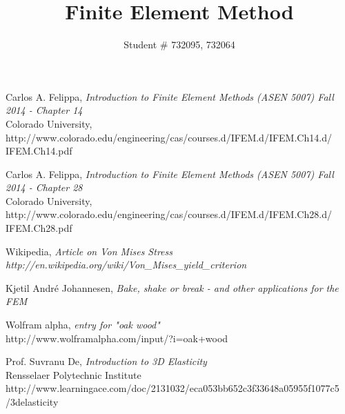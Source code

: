 \documentclass[9pt]{extarticle}
\title{Finite Element Method}
\author{Student \# 732095, 732064 }
\begin{document}
\maketitle































\newpage
\begin{thebibliography}{3}

	Carlos A. Felippa, \emph{Introduction to Finite Element Methods (ASEN 5007) Fall 2014  - Chapter 14} \\
	 Colorado University, \\	http://www.colorado.edu/engineering/cas/courses.d/IFEM.d/IFEM.Ch14.d/\\IFEM.Ch14.pdf



Carlos A. Felippa, \emph{Introduction to Finite Element Methods (ASEN 5007) Fall 2014  - Chapter 28} \\	
 Colorado University, \\	http://www.colorado.edu/engineering/cas/courses.d/IFEM.d/IFEM.Ch28.d/\\IFEM.Ch28.pdf


Wikipedia, \emph{Article on Von Mises Stress} \\
\emph{http://en.wikipedia.org/wiki/Von\_Mises\_yield\_criterion}

Kjetil André Johannesen, 
\emph{Bake, shake or break - and other applications for the FEM}

	Wolfram alpha, \emph{entry for "oak wood"}\\
	http://www.wolframalpha.com/input/?i=oak+wood
	
	Prof. Suvranu De, \emph{Introduction to 3D Elasticity} \\
	Rensselaer Polytechnic Institute \\
	http://www.learningace.com/doc/2131032/eca053bb652c3f33648a05955f1077c5\\/3delasticity


\end{thebibliography}
\end{document}
